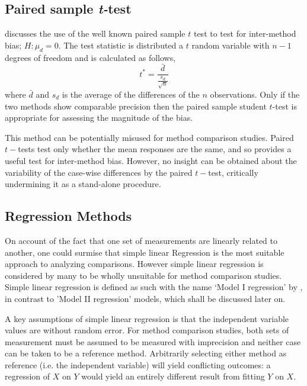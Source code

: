 \documentclass[12pt, a4paper]{report}
\theoremstyle{plain}
\theoremstyle{definition}
\theoremstyle{remark}
\begin{document}
	
	\subsection{Paired sample \emph{t-}test}
	\citet{Bartko} discusses the use of the well known paired sample $t$ test to test for inter-method bias; $H: \mu_{d}=0$. The test
	statistic is distributed a $t$ random variable with $n-1$ degrees of freedom and is calculated as follows,
	\begin{equation}
	t^{*} = \frac{\bar{d}}{ \frac{s_{d}}{\sqrt{n}}}
	\end{equation}
	where $\bar{d}$ and $s_{d}$ is the average of the differences of the $n$ observations. Only if the two methods show comparable
	precision then the paired sample student $t$-test is appropriate for assessing the magnitude of the bias.
	
	This method can be potentially misused for method comparison studies. Paired $t-$tests test only whether the mean responses are the same, and so provides a useful test for inter-method bias. However, no insight can be obtained about the variability of the case-wise differences by the paired $t-$test, critically undermining it as a stand-alone procedure.

	

	\subsection{Regression Methods}
		On account of the fact that one set of measurements are linearly related to another, one could surmise that simple linear Regression is the most suitable approach to analyzing comparisons. However simple linear regression  is considered by many \citet{BA83,CornCoch,ludbrook97} to be wholly unsuitable for method comparison studies. Simple linear regression is defined as such with the name `Model I regression' by \citet{CornCoch}, in contrast to 'Model II regression' models, which shall be discussed later on.
		
		A key assumptions of simple linear regression is that the independent variable values are without random error. 	
		For method comparison studies, both sets of measurement must be assumed to be measured with imprecision and neither case can be taken to be a reference method. Arbitrarily
		selecting either method as reference (i.e. the independent variable) will yield conflicting outcomes: a regression of $X$ on $Y$ would yield an entirely different result from fitting $Y$ on $X$.
	
\end{document}
